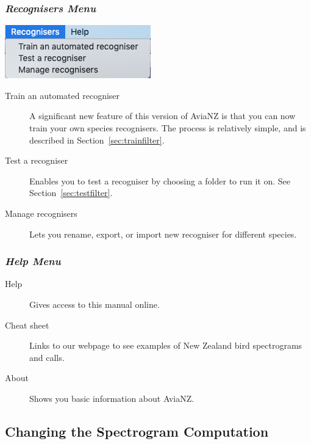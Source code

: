 \documentclass{article}
\begin{document}
\subsubsection{{\em Recognisers Menu}}

\begin{center}
\includegraphics[width=.3\textwidth]{Figs/recognisersmenu}
\end{center}

\begin{description}
\item [Train an automated recogniser] A significant new feature of this version of AviaNZ is that you can now train your own species recognisers. The process is relatively simple, and is described in Section~\ref{sec:trainfilter}.
\item [Test a recogniser] Enables you to test a recogniser by choosing a folder to run it on. See Section~\ref{sec:testfilter}.
\item[Manage recognisers] Lets you rename, export, or import new recogniser for different species. %
\end{description}

\subsubsection{{\em Help Menu}}

\begin{description}
\item [Help] Gives access to this manual online.
\item [Cheat sheet] Links to our webpage to see examples of New Zealand bird spectrograms and calls.
\item[About] Shows you basic information about AviaNZ.
\end{description}


\subsection{Changing the Spectrogram Computation}\label{sec:spectrogram2}
\end{document}
